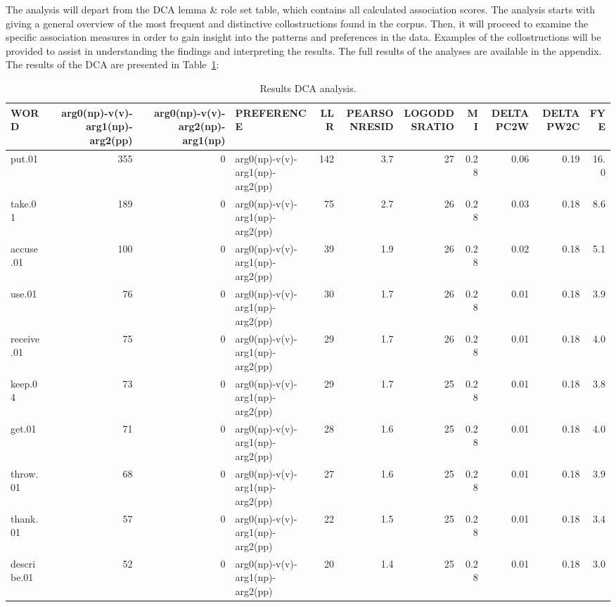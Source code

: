 \documentclass[
  letterpaper,
  DIV=11,
  numbers=noendperiod]{scrartcl}
\begin{document}
The analysis will depart from the DCA lemma \& role set table, which
contains all calculated association scores. The analysis starts with
giving a general overview of the most frequent and distinctive
collostructions found in the corpus. Then, it will proceed to examine
the specific association measures in order to gain insight into the
patterns and preferences in the data. Examples of the collostructions
will be provided to assist in understanding the findings and
interpreting the results. The full results of the analyses are available
in the appendix. The results of the DCA are presented in
Table~\ref{tbl-dca-roleset}:

\hypertarget{tbl-dca-roleset}{}
\begin{table}
\caption{\label{tbl-dca-roleset}Results DCA analysis. }\tabularnewline

\centering
\begin{tabular}[t]{l|r|r|l|r|r|r|r|r|r|r}
\hline
WORD & arg0(np)-v(v)-arg1(np)-arg2(pp) & arg0(np)-v(v)-arg2(np)-arg1(np) & PREFERENCE & LLR & PEARSONRESID & LOGODDSRATIO & MI & DELTAPC2W & DELTAPW2C & FYE\\
\hline
put.01 & 355 & 0 & arg0(np)-v(v)-arg1(np)-arg2(pp) & 142 & 3.7 & 27 & 0.28 & 0.06 & 0.19 & 16.0\\
\hline
take.01 & 189 & 0 & arg0(np)-v(v)-arg1(np)-arg2(pp) & 75 & 2.7 & 26 & 0.28 & 0.03 & 0.18 & 8.6\\
\hline
accuse.01 & 100 & 0 & arg0(np)-v(v)-arg1(np)-arg2(pp) & 39 & 1.9 & 26 & 0.28 & 0.02 & 0.18 & 5.1\\
\hline
use.01 & 76 & 0 & arg0(np)-v(v)-arg1(np)-arg2(pp) & 30 & 1.7 & 26 & 0.28 & 0.01 & 0.18 & 3.9\\
\hline
receive.01 & 75 & 0 & arg0(np)-v(v)-arg1(np)-arg2(pp) & 29 & 1.7 & 26 & 0.28 & 0.01 & 0.18 & 4.0\\
\hline
keep.04 & 73 & 0 & arg0(np)-v(v)-arg1(np)-arg2(pp) & 29 & 1.7 & 25 & 0.28 & 0.01 & 0.18 & 3.8\\
\hline
get.01 & 71 & 0 & arg0(np)-v(v)-arg1(np)-arg2(pp) & 28 & 1.6 & 25 & 0.28 & 0.01 & 0.18 & 4.0\\
\hline
throw.01 & 68 & 0 & arg0(np)-v(v)-arg1(np)-arg2(pp) & 27 & 1.6 & 25 & 0.28 & 0.01 & 0.18 & 3.9\\
\hline
thank.01 & 57 & 0 & arg0(np)-v(v)-arg1(np)-arg2(pp) & 22 & 1.5 & 25 & 0.28 & 0.01 & 0.18 & 3.4\\
\hline
describe.01 & 52 & 0 & arg0(np)-v(v)-arg1(np)-arg2(pp) & 20 & 1.4 & 25 & 0.28 & 0.01 & 0.18 & 3.0\\
\hline
\end{tabular}
\end{table}
\end{document}
